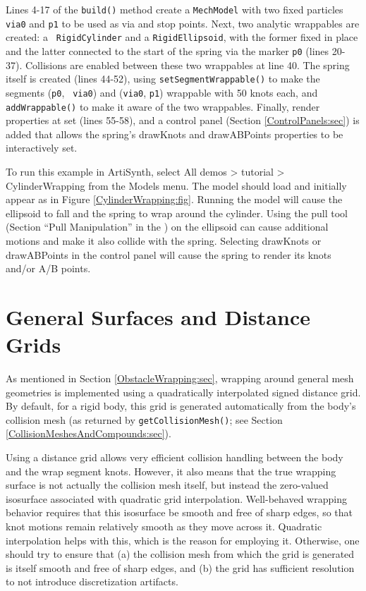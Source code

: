 Lines 4-17 of the {\tt build()} method create a {\tt MechModel} with
two fixed particles {\tt via0} and {\tt p1} to be used as via and stop
points. Next, two analytic wrappables are created: a {\tt
RigidCylinder} and a {\tt RigidEllipsoid}, with the former fixed in
place and the latter connected to the start of the spring via the
marker {\tt p0} (lines 20-37). Collisions are enabled between these
two wrappables at line 40. The spring itself is created (lines 44-52),
using {\tt setSegmentWrappable()} to make the segments ({\tt p0}, {\tt
via0}) and ({\tt via0}, {\tt p1}) wrappable with 50 knots each, and
{\tt addWrappable()} to make it aware of the two wrappables.  Finally,
render properties at set (lines 55-58), and a control panel (Section
\ref{ControlPanels:sec}) is added that allows the spring's {\sf
drawKnots} and {\sf drawABPoints} properties to be interactively set.

To run this example in ArtiSynth, select {\sf All demos > tutorial >
CylinderWrapping} from the {\sf Models} menu. The model should load and
initially appear as in Figure \ref{CylinderWrapping:fig}.  Running the
model will cause the ellipsoid to fall and the spring to wrap around
the cylinder. Using the pull tool
(Section ``Pull Manipulation'' in the
)
on the ellipsoid can cause additional motions and make it also collide
with the spring. Selecting {\sf drawKnots} or {\sf drawABPoints} in
the control panel will cause the spring to render its knots and/or A/B
points.

\section{General Surfaces and Distance Grids}
\label{GeneralSurfaceWrapping:sec}

As mentioned in Section \ref{ObstacleWrapping:sec}, wrapping around
general mesh geometries is implemented using a quadratically
interpolated signed distance grid. By default, for a rigid body, this
grid is generated automatically from the body's collision mesh (as
returned by {\tt getCollisionMesh()}; see Section
\ref{CollisionMeshesAndCompounds:sec}).

Using a distance grid allows very efficient collision handling between
the body and the wrap segment knots. However, it also means that the
true wrapping surface is not actually the collision mesh itself, but
instead the zero-valued isosurface associated with quadratic grid
interpolation.  Well-behaved wrapping behavior requires that this
isosurface be smooth and free of sharp edges, so that knot motions
remain relatively smooth as they move across it. Quadratic
interpolation helps with this, which is the reason for employing
it. Otherwise, one should try to ensure that (a) the collision mesh
from which the grid is generated is itself smooth and free of sharp
edges, and (b) the grid has sufficient resolution to not introduce
discretization artifacts.

